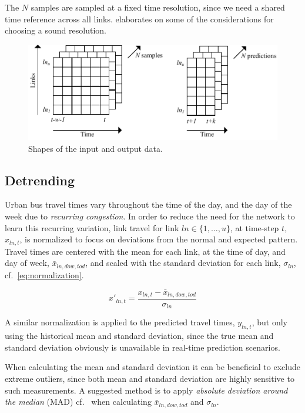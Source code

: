 \documentclass[preprint,11pt,5p,twocolumn]{elsarticle}
\begin{document}
The $N$ samples are sampled at a fixed time resolution, since we need a shared time reference across all links.  elaborates on some of the considerations for choosing a sound resolution.

\begin{figure}[!ht]
  \centering
  \includegraphics[scale=1.0]{drawings/data_shape.pdf}
  \caption{Shapes of the input and output data.}
  \label{fig:data_shape}
\end{figure}

\subsection{Detrending}
Urban bus travel times vary throughout the time of the day, and the day of the week due to \emph{recurring congestion}. In order to reduce the need for the network to learn this recurring variation, link travel for link $\mathit{ln} \in \{ 1,\ldots,u\}$, at time-step $t$, $x_{\mathit{ln},t}$, is normalized to focus on deviations from the normal and expected pattern. Travel times are centered with the mean for each link, at the time of day, and day of week, $\mathit{\bar{x}_{\mathit{ln},\mathit{dow},\mathit{tod}}}$, and scaled with the standard deviation for each link, $\sigma_\mathit{ln}$, cf.~\cref{eq:normalization}.

\begin{equation}
  x'_{\mathit{ln},t} = \frac{x_{\mathit{ln},t} - \bar{x}_{\mathit{ln},\mathit{dow},\mathit{tod}}}{\sigma_\mathit{ln}}
  \label{eq:normalization}
\end{equation}

A similar normalization is applied to the predicted travel times, $y_{\mathit{ln},t}$, but only using the historical mean and standard deviation, since the true mean and standard deviation obviously is unavailable in real-time prediction scenarios.

When calculating the mean and standard deviation it can be beneficial to exclude extreme outliers, since both mean and standard deviation are highly sensitive to such measurements. A suggested method is to apply \emph{absolute deviation around the median} (MAD) cf.~\cite{Olewuezi2011} when calculating $\mathit{\bar{x}_{\mathit{ln},\mathit{dow},\mathit{tod}}}$ and $\sigma_\mathit{ln}$.
\end{document}
